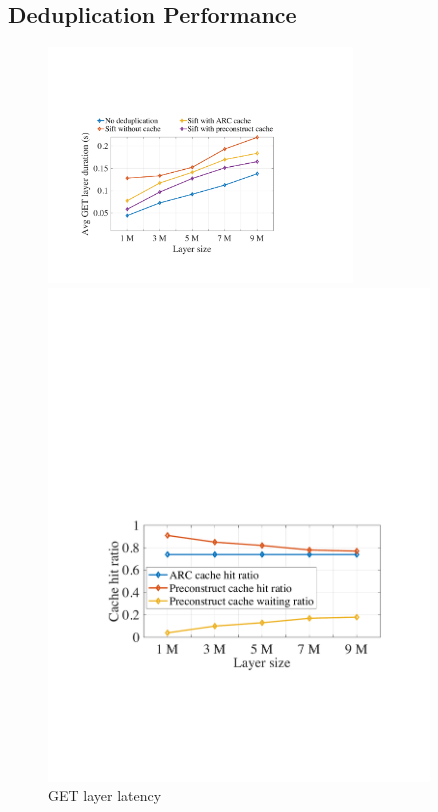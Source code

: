 

\subsection{Deduplication Performance}
\label{sec:eval-dedup}


\begin{figure}[t]
	\centering
	\begin{minipage}{0.3\textwidth}
		\centering
		\includegraphics[width=0.72\textwidth]{graphs/1nodegetlayerlatency.pdf}
		\caption{GET layer latency}
		\label{fig:eval-1nodegetlayerlatency}
	\end{minipage}%
	\begin{minipage}{0.3\textwidth}
		\centering
		\includegraphics[width=0.9\textwidth]{graphs/cachehitratio.pdf}

\end{minipage}
\end{figure}
